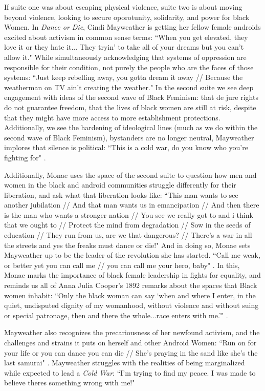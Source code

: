 \documentclass[a4paper, 11pt]{article} %
\begin{document}
If suite one was about escaping physical violence, suite two is about moving beyond violence, looking to secure oporotunity, solidarity, and power for black Women.
In \emph{Dance or Die}, Cindi Mayweather is getting her fellow female androids excited about activism in common sense terms:
``When you get elevated, they love it or they hate it... They tryin' to take all of your dreams but you can't allow it." \cite{danceordie}
While simultaneously acknowledging that systems of oppression are responsible for their condition, not purely the people who are the faces of those systems:
``Just keep rebelling away, you gotta dream it away // Because the weatherman on TV ain't creating the weather." \cite{danceordie}
In the second suite we see deep engagement with ideas of the second wave of Black Feminism: that de jure rights do not guarantee freedom, that the lives of black women are still at risk, despite that they might have more access to more establishment protections.
Additionally, we see the hardening of ideological lines (much as we do within the second wave of Black Feminism), bystanders are no longer neutral, Mayweather implores that silence is political:
``This is a cold war, do you know who you're fighting for" \cite{coldwar}.

Additionally, Monae uses the space of the second suite to question how men and women in the black and android communities struggle differently for their liberation, and ask what that liberation looks like:
``This man wants to see another jubilation //
And that man wants us in emancipation //
And then there is the man who wants a stronger nation //
You see we really got to and i think that we ought to //
Protect the mind from degradation //
Sow in the seeds of education //
They run from us, are we that dangerous? //
There's a war in all the streets and yes the freaks must dance or die!" \cite{danceordie}
And in doing so, Monae sets Mayweather up to be the leader of the revolution she has started.
``Call me weak, or better yet you can call me // you can call me your hero, baby" \cite{faster}.
In this, Monae marks the importance of black female leadership in fights for equality, and reminds us all of Anna Julia Cooper's 1892 remarks about the spaces that Black women inhabit:
``Only the black woman can say `when and where I enter, in the quiet, undisputed dignity of my womanhood, without violence and without suing or special patronage, then and there the whole...race enters with me.'" \cite{cooper1892}.

Mayweather also recognizes the precariousness of her newfound activism, and the challenges and strains it puts on herself and other Android Women:
``Run on for your life or you can dance you can die // She's praying in the sand like she's the last samurai" \cite{danceordie}.
Mayweather struggles with the realities of being marginalized while expected to lead a \emph{Cold War}:
``I'm trying to find my peace.  I was made to believe theres something wrong with me!" \cite{coldwar}
\end{document}
